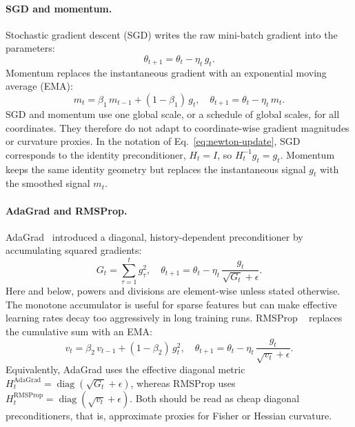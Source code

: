 \paragraph{SGD and momentum.}
Stochastic gradient descent (SGD) writes the raw mini-batch gradient into the
parameters:
\begin{equation}
  \theta_{t+1} = \theta_t - \eta_t\,g_t.
  \label{eq:sgd}
\end{equation}
Momentum replaces the instantaneous gradient with an exponential moving
average (EMA):
\begin{equation}
  m_t = \beta_1\,m_{t-1} + (1-\beta_1)\,g_t,\quad
  \theta_{t+1} = \theta_t - \eta_t\,m_t.
  \label{eq:sgdm}
\end{equation}
SGD and momentum use one global scale, or a schedule of global scales, for all
coordinates.  They therefore do not adapt to coordinate-wise gradient
magnitudes or curvature proxies.
In the notation of Eq.~\eqref{eq:newton-update}, SGD corresponds to the
identity preconditioner, $H_t=I$, so $H_t^{-1}g_t=g_t$.  Momentum keeps the
same identity geometry but replaces the instantaneous signal $g_t$ with the
smoothed signal $m_t$.

\paragraph{AdaGrad and RMSProp.}
AdaGrad~\cite{duchi2011adaptive} introduced a diagonal, history-dependent
preconditioner by accumulating squared gradients:
\begin{equation}
  G_t = \sum_{\tau=1}^{t}g_\tau^2,\quad
  \theta_{t+1}
  = \theta_t - \eta_t\,\frac{g_t}{\sqrt{G_t}+\epsilon}.
  \label{eq:adagrad}
\end{equation}
Here and below, powers and divisions are element-wise unless stated otherwise.
The monotone accumulator is useful for sparse features but can make effective
learning rates decay too aggressively in long training runs.  RMSProp
~\cite{tieleman2012rmsprop} replaces the cumulative sum with an EMA:
\begin{equation}
  v_t = \beta_2\,v_{t-1}+(1-\beta_2)\,g_t^2,\quad
  \theta_{t+1}
  = \theta_t - \eta_t\,\frac{g_t}{\sqrt{v_t}+\epsilon}.
  \label{eq:rmsprop}
\end{equation}
Equivalently, AdaGrad uses the effective diagonal metric
$H_t^{\mathrm{AdaGrad}}=\operatorname{diag}(\sqrt{G_t}+\epsilon)$, whereas
RMSProp uses $H_t^{\mathrm{RMSProp}}=\operatorname{diag}(\sqrt{v_t}+\epsilon)$.
Both should be read as cheap diagonal preconditioners, that is, approximate
proxies for Fisher or Hessian curvature.

